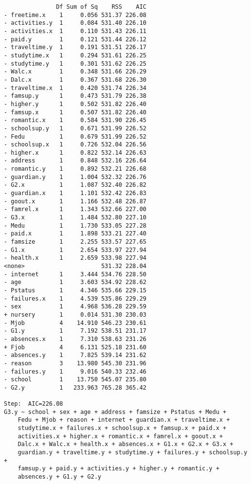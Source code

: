 \documentclass[11pt]{article}
\begin{document}
\begin{enumerate}
\begin{verbatim}
               Df Sum of Sq    RSS    AIC
- freetime.x    1     0.056 531.37 226.08
- activities.y  1     0.084 531.40 226.10
- activities.x  1     0.110 531.43 226.11
- paid.y        1     0.121 531.44 226.12
- traveltime.y  1     0.191 531.51 226.17
- studytime.x   1     0.294 531.61 226.25
- studytime.y   1     0.301 531.62 226.25
- Walc.x        1     0.348 531.66 226.29
- Dalc.x        1     0.367 531.68 226.30
- traveltime.x  1     0.420 531.74 226.34
- famsup.y      1     0.473 531.79 226.38
- higher.y      1     0.502 531.82 226.40
- famsup.x      1     0.507 531.82 226.40
- romantic.x    1     0.584 531.90 226.45
- schoolsup.y   1     0.671 531.99 226.52
- Fedu          1     0.679 531.99 226.52
- schoolsup.x   1     0.726 532.04 226.56
- higher.x      1     0.822 532.14 226.63
- address       1     0.848 532.16 226.64
- romantic.y    1     0.892 532.21 226.68
- guardian.y    1     1.004 532.32 226.76
- G2.x          1     1.087 532.40 226.82
- guardian.x    1     1.101 532.42 226.83
- goout.x       1     1.166 532.48 226.87
- famrel.x      1     1.343 532.66 227.00
- G3.x          1     1.484 532.80 227.10
- Medu          1     1.730 533.05 227.28
- paid.x        1     1.898 533.21 227.40
- famsize       1     2.255 533.57 227.65
- G1.x          1     2.654 533.97 227.94
- health.x      1     2.659 533.98 227.94
<none>                      531.32 228.04
- internet      1     3.444 534.76 228.50
- age           1     3.603 534.92 228.62
- Pstatus       1     4.346 535.66 229.15
- failures.x    1     4.539 535.86 229.29
- sex           1     4.968 536.28 229.59
+ nursery       1     0.014 531.30 230.03
- Mjob          4    14.910 546.23 230.61
- G1.y          1     7.192 538.51 231.17
- absences.x    1     7.310 538.63 231.26
+ Fjob          4     6.131 525.18 231.60
- absences.y    1     7.825 539.14 231.62
- reason        3    13.980 545.30 231.96
- failures.y    1     9.016 540.33 232.46
- school        1    13.750 545.07 235.80
- G2.y          1   233.963 765.28 365.42

Step:  AIC=226.08
G3.y ~ school + sex + age + address + famsize + Pstatus + Medu + 
    Fedu + Mjob + reason + internet + guardian.x + traveltime.x + 
    studytime.x + failures.x + schoolsup.x + famsup.x + paid.x + 
    activities.x + higher.x + romantic.x + famrel.x + goout.x + 
    Dalc.x + Walc.x + health.x + absences.x + G1.x + G2.x + G3.x + 
    guardian.y + traveltime.y + studytime.y + failures.y + schoolsup.y + 
    famsup.y + paid.y + activities.y + higher.y + romantic.y + 
    absences.y + G1.y + G2.y


\end{verbatim}
\end{enumerate}
\end{document}
